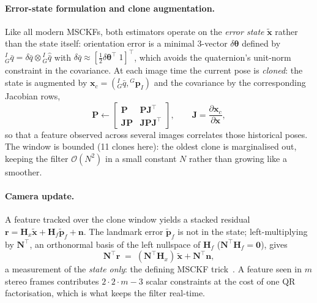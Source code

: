 \paragraph{Error-state formulation and clone augmentation.} Like all modern
MSCKFs, both estimators operate on the \emph{error state}
$\tilde{\mathbf{x}}$ rather than the state itself: orientation error is a
minimal 3-vector $\delta\boldsymbol{\theta}$ defined by
${}^{I}_{G}\bar{q} = \delta\bar{q} \otimes {}^{I}_{G}\hat{\bar{q}}$ with
$\delta\bar{q} \approx [\tfrac{1}{2}\delta\boldsymbol{\theta}^{\!\top}\; 1]^{\top}$,
which avoids the quaternion's unit-norm constraint in the covariance. At each
image time the current pose is \emph{cloned}: the state is augmented by
$\mathbf{x}_{c} = ({}^{I}_{G}\bar{q}, {}^{G}\mathbf{p}_{I})$ and the covariance
by the corresponding Jacobian rows,
\begin{equation}
\mathbf{P} \leftarrow
\begin{bmatrix} \mathbf{P} & \mathbf{P}\mathbf{J}^{\!\top} \\
\mathbf{J}\mathbf{P} & \mathbf{J}\mathbf{P}\mathbf{J}^{\!\top}\end{bmatrix},
\qquad
\mathbf{J} = \frac{\partial \mathbf{x}_c}{\partial \mathbf{x}},
\end{equation}
so that a feature observed across several images correlates those historical
poses. The window is bounded (11 clones here): the oldest clone is
marginalised out, keeping the filter $\mathcal{O}(N^2)$ in a small constant
$N$ rather than growing like a smoother.

\paragraph{Camera update.} A feature tracked over the clone window yields a
stacked residual $\mathbf{r} = \mathbf{H}_x\tilde{\mathbf{x}} +
\mathbf{H}_f\tilde{\mathbf{p}}_f + \mathbf{n}$. The landmark error
$\tilde{\mathbf{p}}_f$ is not in the state; left-multiplying by
$\mathbf{N}^{\!\top}$, an orthonormal basis of the left nullspace of
$\mathbf{H}_f$ ($\mathbf{N}^{\!\top}\mathbf{H}_f = \mathbf{0}$), gives
\begin{equation}
\mathbf{N}^{\!\top}\mathbf{r} \;=\;
(\mathbf{N}^{\!\top}\mathbf{H}_x)\,\tilde{\mathbf{x}} +
\mathbf{N}^{\!\top}\mathbf{n},
\end{equation}
a measurement of the \emph{state only}: the defining MSCKF
trick~\cite{mourikis2007msckf}. A feature seen in $m$ stereo frames
contributes $2\cdot2\cdot m - 3$ scalar constraints at the cost of one QR
factorisation, which is what keeps the filter real-time.

